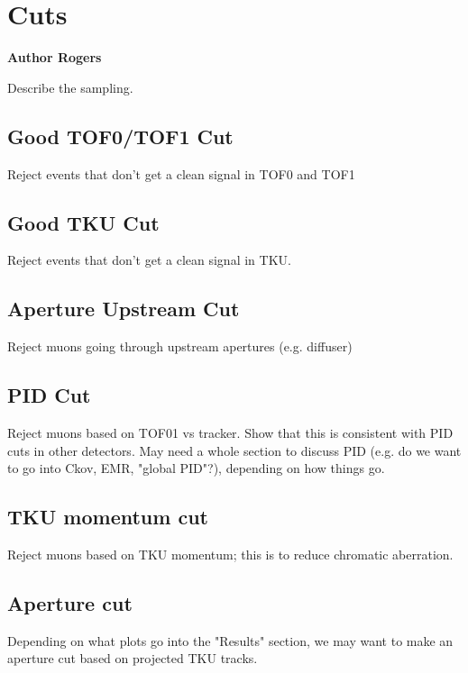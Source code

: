 \section{Cuts}

\bf{Author Rogers}

Describe the sampling.

\subsection{Good TOF0/TOF1 Cut}

Reject events that don't get a clean signal in TOF0 and TOF1

\subsection{Good TKU Cut}

Reject events that don't get a clean signal in TKU.

\subsection{Aperture Upstream Cut}

Reject muons going through upstream apertures (e.g. diffuser)

\subsection{PID Cut}

Reject muons based on TOF01 vs tracker. Show that this is consistent with PID
cuts in other detectors. May need a whole section to discuss PID (e.g. 
do we want to go into Ckov, EMR, "global PID"?), depending on how things go.

\subsection{TKU momentum cut}

Reject muons based on TKU momentum; this is to reduce chromatic aberration.

\subsection{Aperture cut}

Depending on what plots go into the "Results" section, we may want to make an
aperture cut based on projected TKU tracks.





